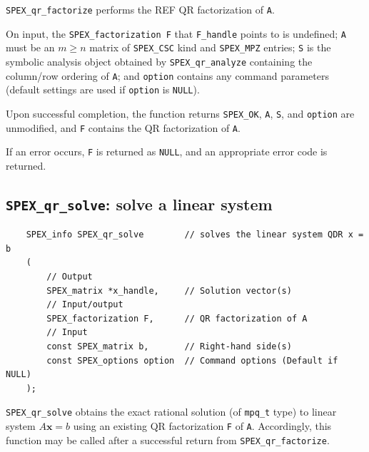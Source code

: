 \documentclass[12pt,oneside]{book}
\theoremstyle{definition}
\newcommand{\x}{\mathbf{x}}
\begin{document}
\verb|SPEX_qr_factorize| performs the REF QR factorization of \verb|A|.

On input, the \verb|SPEX_factorization F| that \verb|F_handle| points to is undefined; \verb|A| must be an $m \geq n$ matrix of \verb|SPEX_CSC| kind and \verb|SPEX_MPZ| entries; \verb|S| is the symbolic analysis object
obtained by \verb|SPEX_qr_analyze| containing the column/row
ordering of \verb|A|; and \verb|option| contains any command parameters (default settings are used if \verb|option| is \verb|NULL|). 

Upon successful completion, the function returns \verb|SPEX_OK|, \verb|A|,
\verb|S|, and \verb|option| are unmodified, and \verb|F| contains the QR
factorization of \verb|A|.

If an error occurs, \verb|F| is returned as \verb|NULL|, and an appropriate error code is returned.

\subsection{\texttt{SPEX\_qr\_solve}: solve a linear system} \label{ss:SPEX_QR_solve}
\begin{mdframed}[userdefinedwidth=\textwidth]
{\footnotesize
\begin{verbatim}
    SPEX_info SPEX_qr_solve        // solves the linear system QDR x = b
    (
        // Output
        SPEX_matrix *x_handle,     // Solution vector(s)
        // Input/output
        SPEX_factorization F,      // QR factorization of A
        // Input
        const SPEX_matrix b,       // Right-hand side(s)
        const SPEX_options option  // Command options (Default if NULL)
    );
\end{verbatim}
} \end{mdframed}

\verb|SPEX_qr_solve| obtains the exact rational solution (of \verb|mpq_t| type) to linear system $A\x=b$ using an existing QR factorization \verb|F| of \verb|A|. Accordingly, this function may be called after a successful return from \newline \verb|SPEX_qr_factorize|.
\end{document}
